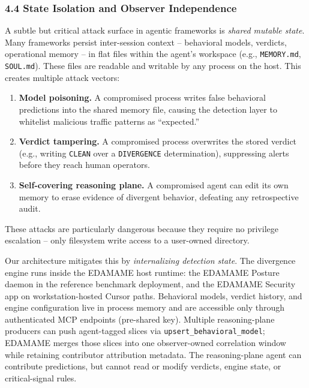 \documentclass[
]{article}
\providecommand{\tightlist}{%
  \setlength{\itemsep}{0pt}\setlength{\parskip}{0pt}}
\begin{document}
\subsubsection{4.4 State Isolation and Observer
Independence}\label{state-isolation-and-observer-independence}

A subtle but critical attack surface in agentic frameworks is
\emph{shared mutable state}. Many frameworks persist inter-session
context -- behavioral models, verdicts, operational memory -- in flat
files within the agent's workspace (e.g., \texttt{MEMORY.md},
\texttt{SOUL.md}). These files are readable and writable by any process
on the host. This creates multiple attack vectors:

\begin{enumerate}
\def\labelenumi{\arabic{enumi}.}
\tightlist
\item
  \textbf{Model poisoning.} A compromised process writes false
  behavioral predictions into the shared memory file, causing the
  detection layer to whitelist malicious traffic patterns as
  ``expected.''
\item
  \textbf{Verdict tampering.} A compromised process overwrites the
  stored verdict (e.g., writing \texttt{CLEAN} over a
  \texttt{DIVERGENCE} determination), suppressing alerts before they
  reach human operators.
\item
  \textbf{Self-covering reasoning plane.} A compromised agent can edit
  its own memory to erase evidence of divergent behavior, defeating any
  retrospective audit.
\end{enumerate}

These attacks are particularly dangerous because they require no
privilege escalation -- only filesystem write access to a user-owned
directory.

Our architecture mitigates this by \emph{internalizing detection state}.
The divergence engine runs inside the EDAMAME host runtime: the EDAMAME
Posture daemon in the reference benchmark deployment, and the EDAMAME
Security app on workstation-hosted Cursor paths. Behavioral models,
verdict history, and engine configuration live in process memory and are
accessible only through authenticated MCP endpoints (pre-shared key).
Multiple reasoning-plane producers can push agent-tagged slices via
\texttt{upsert\_behavioral\_model}; EDAMAME merges those slices into one
observer-owned correlation window while retaining contributor
attribution metadata. The reasoning-plane agent can contribute
predictions, but cannot read or modify verdicts, engine state, or
critical-signal rules.
\end{document}
